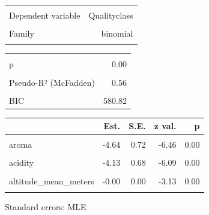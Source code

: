 \documentclass[
  letterpaper,
  DIV=11,
  numbers=noendperiod]{scrartcl}
\begin{document}
\begin{table}[!h]
\centering
\begin{tabular}{lr}
\toprule
\cellcolor{gray!10}{Observations} & \cellcolor{gray!10}{882}\\
Dependent variable & Qualityclass\\
\cellcolor{gray!10}{Type} & \cellcolor{gray!10}{Generalized linear model}\\
Family & binomial\\
\cellcolor{gray!10}{Link} & \cellcolor{gray!10}{logit}\\
\bottomrule
\end{tabular}
\end{table} \begin{table}[!h]
\centering
\begin{tabular}{lr}
\toprule
\cellcolor{gray!10}{$\chi^2$(6)} & \cellcolor{gray!10}{688.21}\\
p & 0.00\\
\cellcolor{gray!10}{Pseudo-R² (Cragg-Uhler)} & \cellcolor{gray!10}{0.72}\\
Pseudo-R² (McFadden) & 0.56\\
\cellcolor{gray!10}{AIC} & \cellcolor{gray!10}{547.34}\\
\addlinespace
BIC & 580.82\\
\bottomrule
\end{tabular}
\end{table} \begin{table}[!h]
\centering
\begin{threeparttable}
\begin{tabular}{lrrrr}
\toprule
  & Est. & S.E. & z val. & p\\
\midrule
\cellcolor{gray!10}{(Intercept)} & \cellcolor{gray!10}{313.21} & \cellcolor{gray!10}{120.90} & \cellcolor{gray!10}{2.59} & \cellcolor{gray!10}{0.01}\\
aroma & -4.64 & 0.72 & -6.46 & 0.00\\
\cellcolor{gray!10}{flavor} & \cellcolor{gray!10}{-7.09} & \cellcolor{gray!10}{0.87} & \cellcolor{gray!10}{-8.17} & \cellcolor{gray!10}{0.00}\\
acidity & -4.13 & 0.68 & -6.09 & 0.00\\
\cellcolor{gray!10}{category\_two\_defects} & \cellcolor{gray!10}{0.00} & \cellcolor{gray!10}{0.03} & \cellcolor{gray!10}{0.00} & \cellcolor{gray!10}{1.00}\\
\addlinespace
altitude\_mean\_meters & -0.00 & 0.00 & -3.13 & 0.00\\
\cellcolor{gray!10}{harvested} & \cellcolor{gray!10}{-0.10} & \cellcolor{gray!10}{0.06} & \cellcolor{gray!10}{-1.61} & \cellcolor{gray!10}{0.11}\\
\bottomrule
\end{tabular}
\begin{tablenotes}
\item Standard errors: MLE
\end{tablenotes}
\end{threeparttable}
\end{table}
\end{document}
